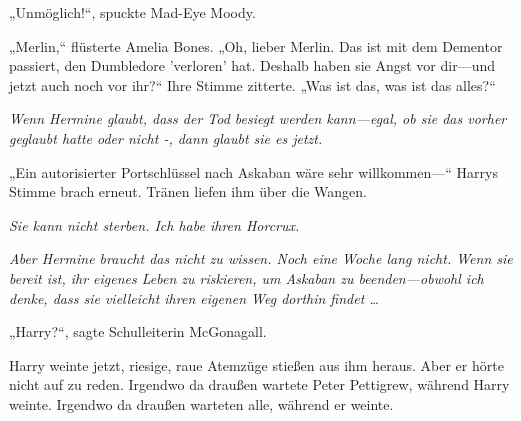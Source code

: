 „Unmöglich!“, spuckte Mad-Eye Moody.

„Merlin,“ flüsterte Amelia Bones. „Oh, lieber Merlin. Das ist mit dem Dementor passiert, den Dumbledore 'verloren' hat. Deshalb haben sie Angst vor dir—und jetzt auch noch vor ihr?“
Ihre Stimme zitterte.
„Was ist das, was ist das alles?“

\emph{Wenn Hermine glaubt, dass der Tod besiegt werden kann—egal, ob sie das vorher geglaubt hatte oder nicht -, dann glaubt sie es jetzt.
}

„Ein autorisierter Portschlüssel nach Askaban wäre sehr willkommen—“
Harrys Stimme brach erneut.
Tränen liefen ihm über die Wangen.

\emph{Sie kann nicht sterben. Ich habe ihren Horcrux.}



\emph{Aber Hermine braucht das nicht zu wissen. Noch eine Woche lang nicht. Wenn sie bereit ist, ihr eigenes Leben zu riskieren, um Askaban zu beenden—obwohl ich denke, dass sie vielleicht ihren eigenen Weg dorthin findet …}

„Harry?“, sagte Schulleiterin McGonagall.

Harry weinte jetzt, riesige, raue Atemzüge stießen aus ihm heraus. Aber er hörte nicht auf zu reden.
Irgendwo da draußen wartete Peter Pettigrew, während Harry weinte.
Irgendwo da draußen warteten alle, während er weinte.

